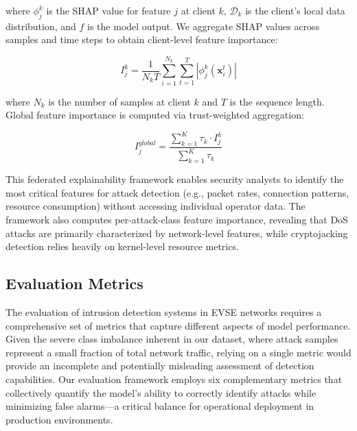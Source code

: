 where $\phi_j^k$ is the SHAP value for feature $j$ at client $k$, $\mathcal{D}_k$ is the client's local data distribution, and $f$ is the model output. We aggregate SHAP values across samples and time steps to obtain client-level feature importance:

\begin{equation}
	\label{equation:local-importance}
	I_j^k = \frac{1}{N_k T} \sum_{i=1}^{N_k} \sum_{t=1}^{T} |\phi_j^k(\mathbf{x}_i^t)|
\end{equation}

where $N_k$ is the number of samples at client $k$ and $T$ is the sequence length. Global feature importance is computed via trust-weighted aggregation:

\begin{equation}
	\label{equation:global-importance}
	I_j^{global} = \frac{\sum_{k=1}^K \tau_k \cdot I_j^k}{\sum_{k=1}^K \tau_k}
\end{equation}

This federated explainability framework enables security analysts to identify the most critical features for attack detection (e.g., packet rates, connection patterns, resource consumption) without accessing individual operator data. The framework also computes per-attack-class feature importance, revealing that DoS attacks are primarily characterized by network-level features, while cryptojacking detection relies heavily on kernel-level resource metrics.

\subsection{Evaluation Metrics}
\label{subsection:evaluation-metrics}
The evaluation of intrusion detection systems in EVSE networks requires a comprehensive set of metrics that capture different aspects of model performance. Given the severe class imbalance inherent in our dataset, where attack samples represent a small fraction of total network traffic, relying on a single metric would provide an incomplete and potentially misleading assessment of detection capabilities. Our evaluation framework employs six complementary metrics that collectively quantify the model's ability to correctly identify attacks while minimizing false alarms—a critical balance for operational deployment in production environments. \\


